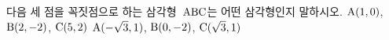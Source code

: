 다음 세 점을 꼭짓점으로 하는 삼각형~$\mathrm{ABC}$는 어떤 삼각형인지 말하시오.
 $\mathrm{A}(1{,}\mkern3mu\mathopen{}0)$, $\mathrm{B}(2{,}\mkern3mu\mathopen{}-2)$, $\mathrm{C}(5{,}\mkern3mu\mathopen{}2)$
 $\mathrm{A}(-\sqrt{3}{,}\mkern3mu\mathopen{}1)$, $\mathrm{B}(0{,}\mkern3mu\mathopen{}-2)$, $\mathrm{C}(\sqrt{3}{,}\mkern3mu\mathopen{}1)$

